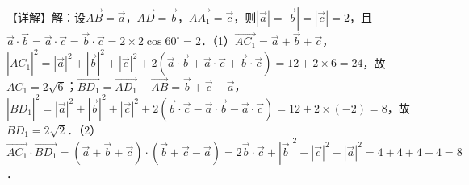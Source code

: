【详解】解：设\(\overrightarrow{AB} = \overrightarrow{a}\)，\(\overrightarrow{AD} = \overrightarrow{b}\)，\(\overrightarrow{AA_{1}} = \overrightarrow{c}\)，则\(\left| \overrightarrow{a} \right| = \allowbreak\left| \overrightarrow{b} \right| = \allowbreak\left| \overrightarrow{c} \right| = 2\)，且\(\overrightarrow{a} \cdot \overrightarrow{b} = \overrightarrow{a} \cdot \overrightarrow{c} = \overrightarrow{b} \cdot \overrightarrow{c} = 2 \times 2\cos 60^{\circ} = 2\)．（1）\(\overrightarrow{AC_{1}} = \overrightarrow{a} + \overrightarrow{b} + \overrightarrow{c}\)，\(\left| \overrightarrow{AC_{1}} \right|^{2} = {\left| \overrightarrow{a} \right|^{2}} + {\left| \overrightarrow{b} \right|^{2}} + {\left| \overrightarrow{c} \right|^{2}} + 2\left( \overrightarrow{a} \cdot \overrightarrow{b} + \overrightarrow{a} \cdot \overrightarrow{c} + \overrightarrow{b} \cdot \overrightarrow{c} \right) = 12 + 2 \times 6 = 24\)，故\(AC_{1} = 2\sqrt{6}\)；\(\overrightarrow{BD_{1}} = \overrightarrow{AD_{1}} - \overrightarrow{AB} = \overrightarrow{b} + \overrightarrow{c} - \overrightarrow{a}\)，\(\left| \overrightarrow{BD_{1}} \right|^{2} = {\left| \overrightarrow{a} \right|^{2}} + {\left| \overrightarrow{b} \right|^{2}} + {\left| \overrightarrow{c} \right|^{2}} + 2\left( \overrightarrow{b} \cdot \overrightarrow{c} - \overrightarrow{a} \cdot \overrightarrow{b} - \overrightarrow{a} \cdot \overrightarrow{c} \right) = 12 + 2 \times \left( - 2 \right) = 8\)，故\(BD_{1} = 2\sqrt{2}\)．（2）\(\overrightarrow{AC_{1}} \cdot \overrightarrow{BD_{1}} = \allowbreak\left( \overrightarrow{a} + \overrightarrow{b} + \overrightarrow{c} \right) \cdot \allowbreak\left( \overrightarrow{b} + \overrightarrow{c} - \overrightarrow{a} \right) = 2\overrightarrow{b} \cdot \overrightarrow{c} + {\left| \overrightarrow{b} \right|^{2}} + {\left| \overrightarrow{c} \right|^{2}} - {\left| \overrightarrow{a} \right|^{2}} = 4 + 4 + 4 - 4 = 8\)．
